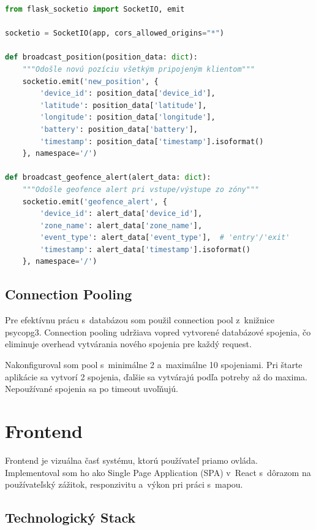 \begin{lstlisting}[language=Python, label=src:websocket, caption={WebSocket broadcast novej GPS pozície}]
from flask_socketio import SocketIO, emit

socketio = SocketIO(app, cors_allowed_origins="*")

def broadcast_position(position_data: dict):
    """Odošle novú pozíciu všetkým pripojeným klientom"""
    socketio.emit('new_position', {
        'device_id': position_data['device_id'],
        'latitude': position_data['latitude'],
        'longitude': position_data['longitude'],
        'battery': position_data['battery'],
        'timestamp': position_data['timestamp'].isoformat()
    }, namespace='/')

def broadcast_geofence_alert(alert_data: dict):
    """Odošle geofence alert pri vstupe/výstupe zo zóny"""
    socketio.emit('geofence_alert', {
        'device_id': alert_data['device_id'],
        'zone_name': alert_data['zone_name'],
        'event_type': alert_data['event_type'],  # 'entry'/'exit'
        'timestamp': alert_data['timestamp'].isoformat()
    }, namespace='/')
\end{lstlisting}

\subsection{Connection Pooling}
\label{sec:ConnectionPooling}

Pre efektívnu prácu s~databázou som použil connection pool z~knižnice psycopg3. Connection pooling udržiava vopred vytvorené databázové spojenia, čo eliminuje overhead vytvárania nového spojenia pre každý request.

Nakonfiguroval som pool s~minimálne 2 a~maximálne 10 spojeniami. Pri štarte aplikácie sa vytvorí 2 spojenia, ďalšie sa vytvárajú podľa potreby až do maxima. Nepoužívané spojenia sa po timeout uvoľňujú.


\section{Frontend}
\label{sec:Frontend}

Frontend je vizuálna časť systému, ktorú používateľ priamo ovláda. Implementoval som ho ako Single Page Application (SPA) v~React s~dôrazom na používateľský zážitok, responzivitu a~výkon pri práci s~mapou.

\subsection{Technologický Stack}
\label{sec:FrontendStack}

